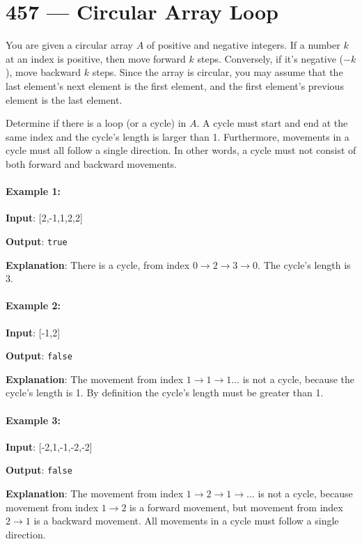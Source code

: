 \section{457 --- Circular Array Loop}
You are given a circular array $A$ of positive and negative integers. If a number $ k $ at an index is positive, then move forward $k$ steps. Conversely, if it's negative ($-k$), move backward $k$ steps. Since the array is circular, you may assume that the last element's next element is the first element, and the first element's previous element is the last element.

Determine if there is a loop (or a cycle) in $A$. A cycle must start and end at the same index and the cycle's length is larger than 1. Furthermore, movements in a cycle must all follow a single direction. In other words, a cycle must not consist of both forward and backward movements.

 
\paragraph{Example 1:}

\begin{flushleft}
\textbf{Input}: [2,-1,1,2,2]

\textbf{Output}: \texttt{true}

\textbf{Explanation}: There is a cycle, from index $0 \longrightarrow 2 \longrightarrow 3 \longrightarrow 0$. The cycle's length is 3.
\end{flushleft}


\paragraph{Example 2:}

\begin{flushleft}
\textbf{Input}: [-1,2]

\textbf{Output}: \texttt{false}

\textbf{Explanation}: The movement from index $1 \longrightarrow 1 \longrightarrow 1 \ldots$ is not a cycle, because the cycle's length is 1. By definition the cycle's length must be greater than 1.

\end{flushleft}


\paragraph{Example 3:}

\begin{flushleft}
\textbf{Input}: [-2,1,-1,-2,-2]

\textbf{Output}: \texttt{false}

\textbf{Explanation}: The movement from index $1 \longrightarrow 2 \longrightarrow 1 \longrightarrow \ldots$ is not a cycle, because movement from index $1 \longrightarrow 2$ is a forward movement, but movement from index $2 \longrightarrow 1$ is a backward movement. All movements in a cycle must follow a single direction.
\end{flushleft}
 

